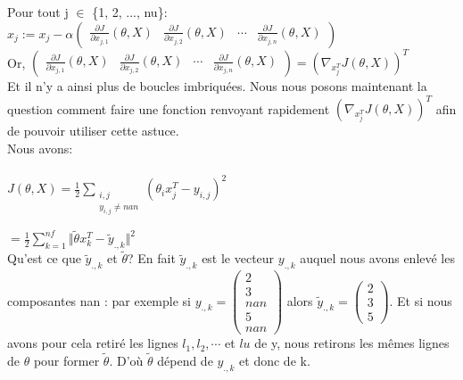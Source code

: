 \documentclass[a4paper,10pt]{article}
\begin{document}
\noindent Pour tout j $\in$ \{1, 2, ..., nu\}:\\
\indent $x_{j} := x_{j}-\alpha
\begin{pmatrix}
\frac{\partial J}{\partial x_{j,1}}(\theta, X) & \frac{\partial J}{\partial x_{j,2}}(\theta, X) & \cdots & \frac{\partial J}{\partial x_{j,n}}(\theta, X)
\end{pmatrix}$\\

\noindent Or, $\begin{pmatrix}
\frac{\partial J}{\partial x_{j,1}}(\theta, X) & \frac{\partial J}{\partial x_{j,2}}(\theta, X) & \cdots & \frac{\partial J}{\partial x_{j,n}}(\theta, X)
\end{pmatrix}
= (\nabla_{x_{j}^T} J(\theta, X))^{T}$\\

\noindent Et il n'y a ainsi plus de boucles imbriqu\'{e}es. Nous nous posons maintenant la question comment faire une fonction renvoyant rapidement $(\nabla_{x_{j}^T} J(\theta, X))^{T}$ afin de pouvoir utiliser cette astuce.\\

\noindent Nous avons:\\\\
$J(\theta, X)=\frac{1}{2}\displaystyle\sum_{\substack{i,j \\ y_{i,j} \ne nan}}(\theta_{i}x_{j}^{T}-y_{i,j})^{2}$

$=\frac{1}{2}\displaystyle\sum_{k=1}^{nf}\Vert\tilde{\theta}x_{k}^{T}-\tilde{y}_{.,k}\Vert^{2}$\\

\noindent Qu'est ce que $\tilde{y}_{.,k}$ et $\tilde{\theta}$? En fait $\tilde{y}_{.,k}$ est le vecteur $y_{.,k}$ auquel nous avons enlev\'{e} les composantes nan : par exemple si $y_{.,k}=
\begin{pmatrix}
2\\3\\nan\\5\\nan
\end{pmatrix}$
alors $\tilde{y}_{.,k}=
\begin{pmatrix}
2\\3\\5
\end{pmatrix}$. Et si nous avons pour cela retir\'{e} les lignes $l_{1}, l_{2}, \cdots$ et $l{u}$ de y, nous retirons les m\^{e}mes lignes de $\theta$ pour former $\tilde{\theta}$.  D'o\`{u} $\tilde{\theta}$ d\'{e}pend de $y_{.,k}$ et donc de k.\\
\end{document}
